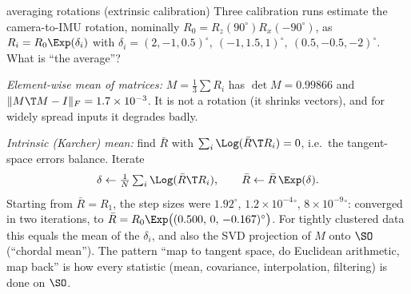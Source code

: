\begin{example}{averaging rotations (extrinsic calibration)}
Three calibration runs estimate the camera-to-IMU rotation, nominally $R_0=R_z(90^\circ)R_x(-90^\circ)$, as $R_i=R_0\Exp(\delta_i)$ with $\delta_i=(2,-1,0.5)^\circ,\ (-1,1.5,1)^\circ,\ (0.5,-0.5,-2)^\circ$. What is ``the average''?

\emph{Element-wise mean of matrices:} $M=\frac13\sum R_i$ has $\det M=0.99866$ and $\|M\T M-I\|_F=1.7\times10^{-3}$. It is not a rotation (it shrinks vectors), and for widely spread inputs it degrades badly.

\emph{Intrinsic (Karcher) mean:} find $\bar R$ with $\sum_i\Log(\bar R\T R_i)=0$, i.e.\ the tangent-space errors balance. Iterate
\[
\delta\leftarrow\tfrac1N\textstyle\sum_i\Log(\bar R\T R_i),\qquad \bar R\leftarrow\bar R\,\Exp(\delta).
\]
Starting from $\bar R=R_1$, the step sizes were $1.92^\circ$, $1.2\times10^{-4}{}^\circ$, $8\times10^{-9}{}^\circ$: converged in two iterations, to $\bar R=R_0\Exp\big((0.500,\,0,\,-0.167)^\circ\big)$. For tightly clustered data this equals the mean of the $\delta_i$, and also the SVD projection of $M$ onto $\SO$ (``chordal mean''). The pattern ``map to tangent space, do Euclidean arithmetic, map back'' is how every statistic (mean, covariance, interpolation, filtering) is done on $\SO$.
\end{example}
